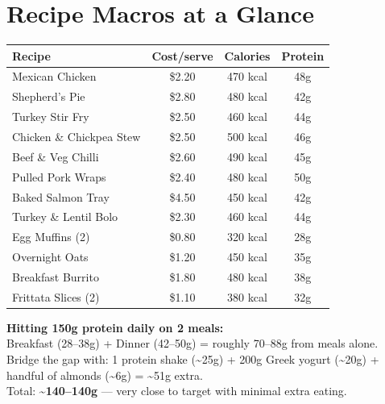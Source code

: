 \documentclass[12pt, a4paper]{book}
\begin{document}
\section*{Recipe Macros at a Glance}

\begin{tabularx}{\linewidth}{|X|c|c|c|}
  \hline
  \rowcolor{primary!20}
  \textbf{Recipe} & \textbf{Cost/serve} & \textbf{Calories} & \textbf{Protein} \\
  \hline
  Mexican Chicken          & \$2.20 & 470 kcal & 48g \\
  \hline
  Shepherd's Pie           & \$2.80 & 480 kcal & 42g \\
  \hline
  Turkey Stir Fry          & \$2.50 & 460 kcal & 44g \\
  \hline
  Chicken \& Chickpea Stew & \$2.50 & 500 kcal & 46g \\
  \hline
  Beef \& Veg Chilli       & \$2.60 & 490 kcal & 45g \\
  \hline
  Pulled Pork Wraps        & \$2.40 & 480 kcal & 50g \\
  \hline
  Baked Salmon Tray        & \$4.50 & 450 kcal & 42g \\
  \hline
  Turkey \& Lentil Bolo    & \$2.30 & 460 kcal & 44g \\
  \hline
  \hline
  \rowcolor{accent!20}
  Egg Muffins (2)          & \$0.80 & 320 kcal & 28g \\
  \hline
  \rowcolor{accent!20}
  Overnight Oats           & \$1.20 & 450 kcal & 35g \\
  \hline
  \rowcolor{accent!20}
  Breakfast Burrito        & \$1.80 & 480 kcal & 38g \\
  \hline
  \rowcolor{accent!20}
  Frittata Slices (2)      & \$1.10 & 380 kcal & 32g \\
  \hline
\end{tabularx}

\vspace{1cm}

\begin{tipbox}
  \textbf{Hitting 150g protein daily on 2 meals:}\\
  Breakfast (28--38g) + Dinner (42--50g) = roughly 70--88g from meals alone. \\
  Bridge the gap with: 1 protein shake (\textasciitilde25g) + 200g Greek yogurt (\textasciitilde20g) + handful of almonds (\textasciitilde6g) = \textasciitilde51g extra. \\
  Total: \textbf{\textasciitilde140--140g} --- very close to target with minimal extra eating.
\end{tipbox}
\end{document}
